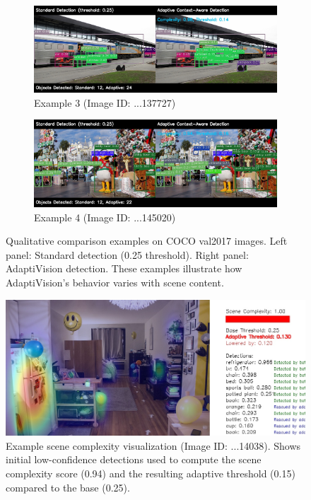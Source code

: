 \documentclass{article}
\begin{document}
\begin{figure}[t]
    \vspace{1em}
    
    \begin{subfigure}[b]{0.48\textwidth}
        \includegraphics[width=\linewidth]{figures/comparison_000000137727.jpg}
        \caption{Example 3 (Image ID: ...137727)}
        \label{fig:qual_137727}
    \end{subfigure}
    \hfill
    \begin{subfigure}[b]{0.48\textwidth}
        \includegraphics[width=\linewidth]{figures/comparison_000000145020.jpg}
        \caption{Example 4 (Image ID: ...145020)}
        \label{fig:qual_145020}
    \end{subfigure}

    \caption{Qualitative comparison examples on COCO val2017 images. Left panel: Standard detection (0.25 threshold). Right panel: AdaptiVision detection. These examples illustrate how AdaptiVision's behavior varies with scene content.}
    \label{fig:qual_examples}
\end{figure}

\begin{figure}[htbp] %
    \centering
    \includegraphics[width=0.7\linewidth]{figures/complexity_000000014038.jpg}
    \caption{Example scene complexity visualization (Image ID: ...14038). Shows initial low-confidence detections used to compute the scene complexity score (0.94) and the resulting adaptive threshold (0.15) compared to the base (0.25).}
    \label{fig:complexity_viz_example}
\end{figure}
\end{document}
